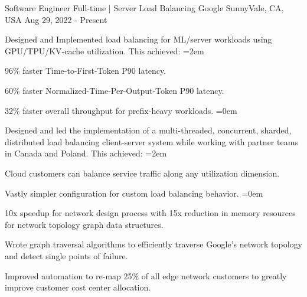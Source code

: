 
\begin{cventries}
  \cventry
    {Software Engineer Full-time | Server Load Balancing} %
    {Google} %
    {SunnyVale, CA, USA} %
    {Aug 29, 2022 - Present} %
    {
      \begin{cvitems} %
        \item {Designed and Implemented load balancing for ML/server workloads
          using GPU/TPU/KV-cache utilization. This achieved:}
        \itemindent=2em
          \item {96\% faster Time-to-First-Token P90 latency.}
          \item {60\% faster Normalized-Time-Per-Output-Token P90 latency.}
          \item {32\% faster overall throughput for prefix-heavy workloads.}
        \itemindent=0em
        \item {Designed and led the implementation of a multi-threaded,
          concurrent, sharded, distributed load balancing client-server system
          while working with partner teams in Canada and Poland. This achieved:}
        \itemindent=2em
        \item {Cloud customers can balance service traffic along any
          utilization dimension.}
        \item {Vastly simpler configuration for custom load balancing behavior.}
        \itemindent=0em
        \item {10x speedup for network design process with 15x reduction in
          memory resources for network topology graph data structures.}
        \item {Wrote graph traversal algorithms to efficiently traverse Google's
          network topology and detect single points of failure.}
        \item {Improved automation to re-map 25\% of all edge network customers
          to greatly improve customer cost center allocation.}
      \end{cvitems}
    }


\end{cventries}
